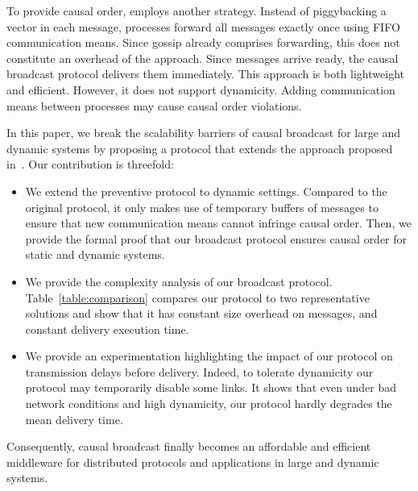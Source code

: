 
To provide causal order, \cite{friedman2004causal} employs another
strategy. Instead of piggybacking a vector in each message, processes forward
all messages exactly once using FIFO communication means. Since gossip already
comprises forwarding, this does not constitute an overhead of the
approach. Since messages arrive ready, the causal broadcast protocol delivers
them immediately. This approach is both lightweight and efficient. However, it
does not support dynamicity. Adding communication means between processes may
cause causal order violations.


In this paper, we break the scalability barriers of causal broadcast for large
and dynamic systems by proposing a protocol that extends the approach proposed
in~\cite{friedman2004causal}.  Our contribution is threefold:
\begin{itemize}[leftmargin=*]
\item We extend the preventive protocol to dynamic settings. Compared to the
  original protocol, it only makes use of temporary buffers of messages to
  ensure that new communication means cannot infringe causal order.  Then, we
  provide the formal proof that our broadcast protocol ensures causal order for
  static and dynamic systems.
\item We provide the complexity analysis of our broadcast
  protocol. Table~\ref{table:comparison} compares our protocol to two
  representative solutions and show that it has constant size overhead on
  messages, and constant delivery execution time.
\item We provide an experimentation highlighting the impact of our protocol on
  transmission delays before delivery. Indeed, to tolerate dynamicity our
  protocol may temporarily disable some links.  It shows that even under bad
  network conditions and high dynamicity, our protocol hardly degrades the mean
  delivery time.
\end{itemize}
Consequently, causal broadcast finally becomes an affordable and efficient
middleware for distributed protocols and applications in large and dynamic
systems.

